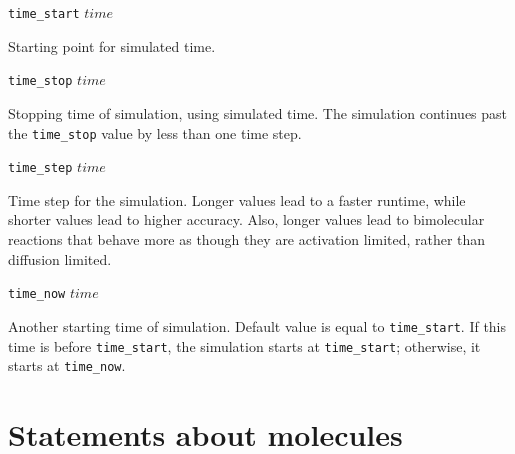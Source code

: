 \documentclass {scrbook}
\newcommand {\ttt} {\texttt}
\begin{document}
\begin{description}
\item{\ttt{time\_start} $time$}

Starting point for simulated time.

\item{\ttt{time\_stop} $time$}

Stopping time of simulation, using simulated time. The simulation continues past the \ttt{time\_stop} value by less than one time step.

\item{\ttt{time\_step} $time$}

Time step for the simulation. Longer values lead to a faster runtime, while shorter values lead to higher accuracy. Also, longer values lead to bimolecular reactions that behave more as though they are activation limited, rather than diffusion limited.

\item{\ttt{time\_now} $time$}

Another starting time of simulation. Default value is equal to \ttt{time\_start}. If this time is before \ttt{time\_start}, the simulation starts at \ttt{time\_start}; otherwise, it starts at \ttt{time\_now}.

\end{description}

\section{Statements about molecules}
\end{document}
